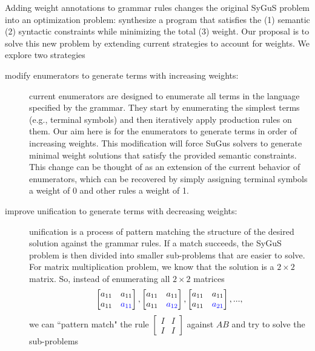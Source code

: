 Adding weight annotations to grammar rules changes the original SyGuS problem into an optimization problem:
%
synthesize a program that satisfies the (1) semantic (2) syntactic constraints while minimizing the total (3) weight.
%
Our proposal is to solve this new problem by extending current strategies to account for weights.
%
We explore two strategies
%
\begin{description}
\item[modify enumerators to generate terms with increasing weights:]
%
current enumerators are designed to enumerate all terms in the language specified by the grammar.
%
They start by enumerating the simplest terms (e.g., terminal symbols) and then iteratively apply production rules on them.
%
Our aim here is for the enumerators to generate terms in order of increasing weights.
%
This modification will force SuGus solvers to generate minimal weight solutions 
%
that satisfy the provided semantic constraints.
%
%
This change can be thought of as an extension of the current behavior of enumerators,
%
which can be recovered by simply assigning terminal symbols a weight of 0 and other rules a weight of 1.
%
\item[improve unification to generate terms with decreasing weights:]
%
unification is a process of pattern matching the structure of the desired solution against the grammar rules.
%
If a match succeeds, the SyGuS problem is then divided into smaller sub-problems that are easier to solve.
%
For matrix multiplication problem, we know that the solution is a $2 \times 2$ matrix. So, instead of enumerating all $2 \times 2$ matrices
%
\begin{equation}
\begin{bmatrix} a_{11} & a_{11} \\ a_{11} & \textcolor{blue}{a_{11}} \end{bmatrix},
\begin{bmatrix} a_{11} & a_{11} \\ a_{11} & \textcolor{blue}{a_{12}} \end{bmatrix},
\begin{bmatrix} a_{11} & a_{11} \\ a_{11} & \textcolor{blue}{a_{21}} \end{bmatrix},
...,
\label{eq:sequence-matrices}
\end{equation}
%
we can ``pattern match" the rule $\begin{bmatrix} I & I \\ I & I \end{bmatrix}$ against $AB$ and try to solve the sub-problems

\end{description}
